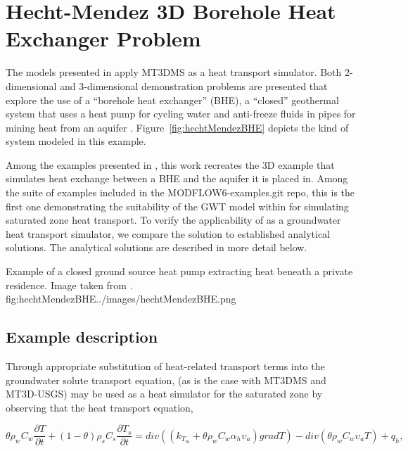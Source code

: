 \section{Hecht-Mendez 3D Borehole Heat Exchanger Problem}

The models presented in \cite{hechtMendez2010} apply MT3DMS \citep{zheng1999mt3dms} as a heat transport simulator.  Both 2-dimensional and 3-dimensional demonstration problems are presented that explore the use of a ``borehole heat exchanger'' (BHE), a ``closed'' geothermal system that uses a heat pump for cycling water and anti-freeze fluids in pipes for mining heat from an aquifer \citep{diao2004}.  Figure~\ref{fig:hechtMendezBHE} depicts the kind of system modeled in this example.

Among the examples presented in \cite{hechtMendez2010}, this work recreates the 3D example that simulates heat exchange between a BHE and the aquifer it is placed in.  Among the suite of examples included in the MODFLOW6-examples.git repo, this is the first one demonstrating the suitability of the GWT model within \mf for simulating saturated zone heat transport.  To verify the applicability of  as a groundwater heat transport simulator, we compare the \mf solution to established analytical solutions.  The analytical solutions are described in more detail below.

\begin{StandardFigure}{
                                     Example of a closed ground source heat pump extracting heat beneath a private residence.  Image taken from \cite{hecht2008}.
                                     }{fig:hechtMendezBHE}{../images/hechtMendezBHE.png}
\end{StandardFigure}

\subsection{Example description}

Through appropriate substitution of heat-related transport terms into the groundwater solute transport equation, \mf (as is the case with MT3DMS and MT3D-USGS) may be used as a heat simulator for the saturated zone by observing that the heat transport equation,

\begin{equation}
	\theta \rho_w C_w \frac{\partial T}{\partial t} + \left( 1 - \theta \right) \rho_s C_s \frac{\partial  T_s}{\partial t} = div \left( \left( k_{T_m} + \theta \rho_w C_w \alpha_h \upsilon_a \right) grad T\right) - div \left( \theta \rho_w C_w \upsilon_a T \right) + q_h,
	\label{eq:hm1}
\end{equation}

